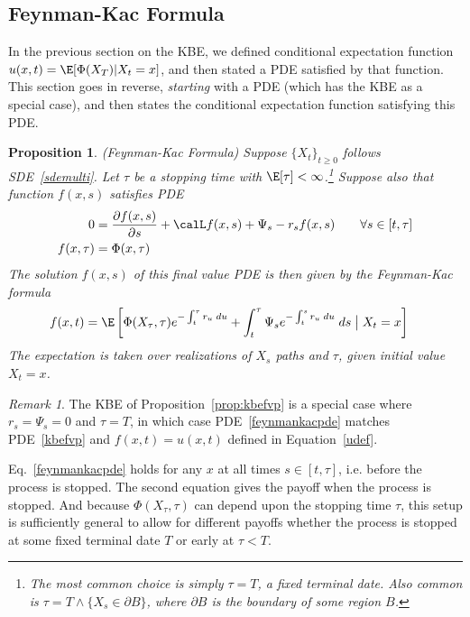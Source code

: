 \documentclass[12pt]{article}
\theoremstyle{plain}
\newtheorem{prop}[thm]{Proposition}
\theoremstyle{definition}
\theoremstyle{remark}
\newtheorem*{rmk}{Remark}
\begin{document}
\clearpage
\subsection{Feynman-Kac Formula}

In the previous section on the KBE, we defined conditional expectation
function $u(x,t)=\E[\Phi(X_T)|X_t=x]$, and then stated a PDE satisfied
by that function.
This section goes in reverse, \emph{starting} with a PDE (which has the
KBE as a special case), and then states the conditional expectation
function satisfying this PDE.

\begin{prop}\emph{(Feynman-Kac Formula)}
Suppose $\{X_t\}_{t\geq 0}$ follows SDE~\ref{sdemulti}.
Let $\tau$ be a stopping time with $\E[\tau]<\infty$.\footnote{%
  The most common choice is simply $\tau=T$, a fixed terminal date. Also
  common is $\tau=T\wedge \{X_s\in\partial B\}$, where $\partial B$ is
  the boundary of some region $B$.
}
Suppose also that function $f(x,s)$ satisfies PDE
\begin{align}
  0
  &=
  \frac{\partial  f(x,s)}{\partial s}
  + \calL f(x,s)
  + \Psi_s
  - r_s f(x,s)
  \qquad
  \forall s\in[t,\tau]
  \label{feynmankacpde}
  \\
  f(x,\tau)
  &=
  \Phi(x,\tau)
  \label{kbeterm}
\end{align}
The solution $f(x,s)$ of this final value PDE is then given by the
Feynman-Kac formula
\begin{align*}
  f(x,t)
  &=
  \E\left[
    \Phi(X_\tau,\tau)
    e^{-\int_t^\tau r_u\;du}
    +
    \int_t^\tau
    \Psi_s
    e^{-\int_t^s r_u\;du}
    \;
    ds
    \;\big|\;
    X_t=x
  \right]
\end{align*}
The expectation is taken over realizations of $X_s$ paths and $\tau$,
given initial value $X_t=x$.
\end{prop}
\begin{rmk}
The KBE of Proposition~\ref{prop:kbefvp} is a special case where
$r_s=\Psi_s=0$ and $\tau=T$, in which case
PDE~\ref{feynmankacpde} matches PDE~\ref{kbefvp} and $f(x,t)=u(x,t)$
defined in Equation~\ref{udef}.

Eq.~\ref{feynmankacpde} holds for any $x$ at all times $s\in[t,\tau]$,
i.e. before the process is stopped. The second equation
gives the payoff when the process is stopped.
And because $\Phi(X_\tau,\tau)$  can depend upon the stopping time
$\tau$, this setup is sufficiently general to allow for different
payoffs whether the process is stopped at some fixed terminal date $T$
or early at $\tau<T$.
\end{rmk}
\end{document}
